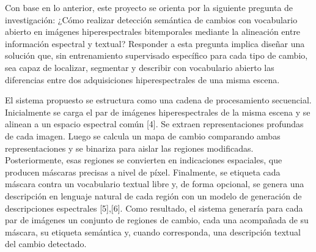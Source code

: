 \documentclass[12pt]{article}
\begin{document}
Con base en lo anterior, este proyecto se orienta por la siguiente pregunta de investigación: ¿Cómo realizar detección semántica de cambios con vocabulario abierto en imágenes hiperespectrales bitemporales mediante la alineación entre información espectral y textual? Responder a esta pregunta implica diseñar una solución que, sin entrenamiento supervisado específico para cada tipo de cambio, sea capaz de localizar, segmentar y describir con vocabulario abierto las diferencias entre dos adquisiciones hiperespectrales de una misma escena.

El sistema propuesto se estructura como una cadena de procesamiento secuencial. Inicialmente se carga el par de imágenes hiperespectrales de la misma escena y se alinean a un espacio espectral común [4]. Se extraen representaciones profundas de cada imagen. Luego se calcula un mapa de cambio comparando ambas representaciones y se binariza para aislar las regiones modificadas. Posteriormente, esas regiones se convierten en indicaciones espaciales, que producen máscaras precisas a nivel de píxel. Finalmente, se etiqueta cada máscara contra un vocabulario textual libre y, de forma opcional, se genera una descripción en lenguaje natural de cada región con un modelo de generación de descripciones espectrales [5],[6]. Como resultado, el sistema generaría para cada par de imágenes un conjunto de regiones de cambio, cada una acompañada de su máscara, su etiqueta semántica y, cuando corresponda, una descripción textual del cambio detectado.
\end{document}
